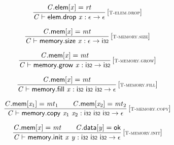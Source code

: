 $$
\begin{array}{@{}c@{}}\displaystyle
\frac{
{\mathit{C}}.\mathsf{elem}[{\mathit{x}}] = {\mathit{rt}}
}{
{\mathit{C}} \vdash \mathsf{elem.drop}~{\mathit{x}} : \epsilon \rightarrow \epsilon
} \, {[\textsc{\scriptsize T{-}elem.drop}]}
\qquad
\end{array}
$$

\vspace{1ex}

$$
\begin{array}{@{}c@{}}\displaystyle
\frac{
{\mathit{C}}.\mathsf{mem}[{\mathit{x}}] = {\mathit{mt}}
}{
{\mathit{C}} \vdash \mathsf{memory.size}~{\mathit{x}} : \epsilon \rightarrow \mathsf{i{\scriptstyle32}}
} \, {[\textsc{\scriptsize T{-}memory.size}]}
\qquad
\end{array}
$$

$$
\begin{array}{@{}c@{}}\displaystyle
\frac{
{\mathit{C}}.\mathsf{mem}[{\mathit{x}}] = {\mathit{mt}}
}{
{\mathit{C}} \vdash \mathsf{memory.grow}~{\mathit{x}} : \mathsf{i{\scriptstyle32}} \rightarrow \mathsf{i{\scriptstyle32}}
} \, {[\textsc{\scriptsize T{-}memory.grow}]}
\qquad
\end{array}
$$

$$
\begin{array}{@{}c@{}}\displaystyle
\frac{
{\mathit{C}}.\mathsf{mem}[{\mathit{x}}] = {\mathit{mt}}
}{
{\mathit{C}} \vdash \mathsf{memory.fill}~{\mathit{x}} : \mathsf{i{\scriptstyle32}}~\mathsf{i{\scriptstyle32}}~\mathsf{i{\scriptstyle32}} \rightarrow \epsilon
} \, {[\textsc{\scriptsize T{-}memory.fill}]}
\qquad
\end{array}
$$

$$
\begin{array}{@{}c@{}}\displaystyle
\frac{
{\mathit{C}}.\mathsf{mem}[{\mathit{x}}_{{1}}] = {\mathit{mt}}_{{1}}
 \qquad
{\mathit{C}}.\mathsf{mem}[{\mathit{x}}_{{2}}] = {\mathit{mt}}_{{2}}
}{
{\mathit{C}} \vdash \mathsf{memory.copy}~{\mathit{x}}_{{1}}~{\mathit{x}}_{{2}} : \mathsf{i{\scriptstyle32}}~\mathsf{i{\scriptstyle32}}~\mathsf{i{\scriptstyle32}} \rightarrow \epsilon
} \, {[\textsc{\scriptsize T{-}memory.copy}]}
\qquad
\end{array}
$$

$$
\begin{array}{@{}c@{}}\displaystyle
\frac{
{\mathit{C}}.\mathsf{mem}[{\mathit{x}}] = {\mathit{mt}}
 \qquad
{\mathit{C}}.\mathsf{data}[{\mathit{y}}] = \mathsf{ok}
}{
{\mathit{C}} \vdash \mathsf{memory.init}~{\mathit{x}}~{\mathit{y}} : \mathsf{i{\scriptstyle32}}~\mathsf{i{\scriptstyle32}}~\mathsf{i{\scriptstyle32}} \rightarrow \epsilon
} \, {[\textsc{\scriptsize T{-}memory.init}]}
\qquad
\end{array}
$$

